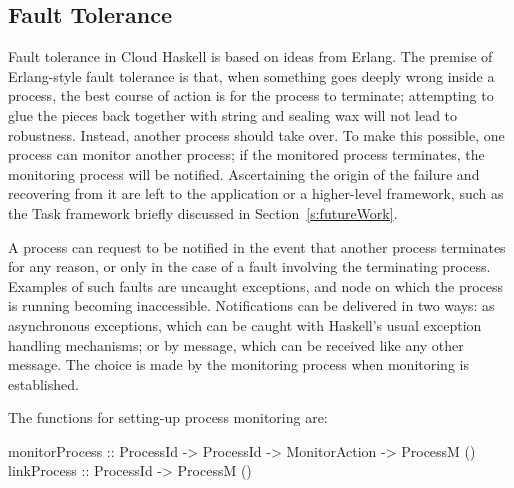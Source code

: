 \documentclass[preprint]{sigplanconf}
\begin{document}

\subsection{Fault Tolerance}
\label{FaultTolerance}
Fault tolerance in Cloud Haskell is based on ideas from Erlang. 
%
The premise of Erlang-style fault tolerance is that, when something goes deeply wrong inside a process, the best course of action is for the process to terminate; attempting to glue the pieces back together with string and sealing wax will not lead to robustness.   Instead, another process should take over.  
To make this possible, one process can monitor another process; if the monitored process terminates, the monitoring process will be notified. 
Ascertaining the origin of the failure and recovering from it are left to the application or a higher-level framework, such as the Task framework briefly discussed in Section~\ref{s:futureWork}.

A process can request to be notified in the event that another process terminates for any reason, or only in the case of a fault involving the terminating process.
Examples of such faults are uncaught exceptions, and node on which the process is running becoming inaccessible. 
Notifications can be delivered in two ways: as asynchronous exceptions, which can be caught with Haskell's usual exception handling mechanisms; or by message, which can be received like any other message.
The choice is made by the monitoring process when monitoring is established.

The functions for setting-up process monitoring are:

\begin{code}
monitorProcess :: ProcessId -> ProcessId
               		-> MonitorAction -> ProcessM ()
linkProcess    :: ProcessId -> ProcessM ()
\end{code}
\end{document}
